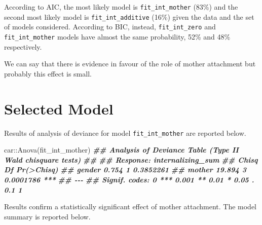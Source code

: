 \documentclass[
]{book}
\newenvironment{Shaded}{\begin{snugshade}}{\end{snugshade}}
\newcommand{\DocumentationTok}[1]{\textcolor[rgb]{0.56,0.35,0.01}{\textbf{\textit{#1}}}}
\newcommand{\FunctionTok}[1]{\textcolor[rgb]{0.00,0.00,0.00}{#1}}
\newcommand{\NormalTok}[1]{#1}
\newcommand{\SpecialCharTok}[1]{\textcolor[rgb]{0.00,0.00,0.00}{#1}}
\begin{document}
According to AIC, the most likely model is \texttt{fit\_int\_mother} (83\%) and the second most likely model is \texttt{fit\_int\_additive} (16\%) given the data and the set of models considered. According to BIC, instead, \texttt{fit\_int\_zero} and \texttt{fit\_int\_mother} models have almost the same probability, 52\% and 48\% respectively.

We can say that there is evidence in favour of the role of mother attachment but probably this effect is small.

\hypertarget{selected-model-2}{%
\section{Selected Model}\label{selected-model-2}}

Results of analysis of deviance for model \texttt{fit\_int\_mother} are reported below.

\begin{Shaded}
\begin{Highlighting}[]
\NormalTok{car}\SpecialCharTok{::}\FunctionTok{Anova}\NormalTok{(fit\_int\_mother)}
\DocumentationTok{\#\# Analysis of Deviance Table (Type II Wald chisquare tests)}
\DocumentationTok{\#\# }
\DocumentationTok{\#\# Response: internalizing\_sum}
\DocumentationTok{\#\#         Chisq Df Pr(\textgreater{}Chisq)    }
\DocumentationTok{\#\# gender  0.754  1  0.3852261    }
\DocumentationTok{\#\# mother 19.894  3  0.0001786 ***}
\DocumentationTok{\#\# {-}{-}{-}}
\DocumentationTok{\#\# Signif. codes:  0 \textquotesingle{}***\textquotesingle{} 0.001 \textquotesingle{}**\textquotesingle{} 0.01 \textquotesingle{}*\textquotesingle{} 0.05 \textquotesingle{}.\textquotesingle{} 0.1 \textquotesingle{} \textquotesingle{} 1}
\end{Highlighting}
\end{Shaded}

Results confirm a statistically significant effect of mother attachment. The model summary is reported below.
\end{document}
